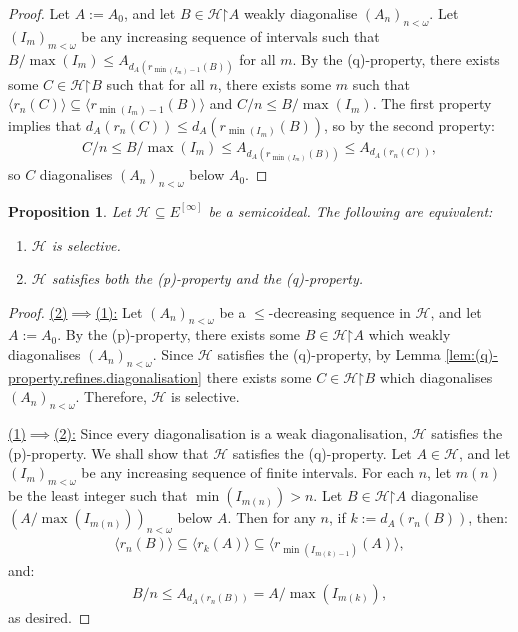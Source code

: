 \documentclass[11pt,reqno]{amsart}
\theoremstyle{plain}
\numberwithin{equation}{section}
\newtheorem{proposition}[theorem]{Proposition}
\theoremstyle{definition}
\renewcommand{\c}[1]{\langle #1 \rangle}
\newcommand{\cal}{\mathcal}
\newcommand{\restrictedto}{\mathord{\upharpoonright}}
\renewcommand{\H}{\cal{H}}
\begin{document}
\begin{proof}
    Let $A := A_0$, and let $B \in \H\restrictedto A$ weakly diagonalise $(A_n)_{n<\omega}$. Let $(I_m)_{m<\omega}$ be any increasing sequence of intervals such that $B/\max(I_m) \leq A_{d_A(r_{\min(I_m)-1}(B))}$ for all $m$. By the (q)-property, there exists some $C \in \H\restrictedto B$ such that for all $n$, there exists some $m$ such that $\c{r_n(C)} \subseteq \c{r_{\min(I_m)-1}(B)}$ and $C/n \leq B/\max(I_m)$. The first property implies that $d_A(r_n(C)) \leq d_A(r_{\min(I_m)}(B))$, so by the second property:
    \begin{align*}
        C/n \leq B/\max(I_m) \leq A_{d_A(r_{\min(I_m)}(B))} \leq A_{d_A(r_n(C))},
    \end{align*}
    so $C$ diagonalises $(A_n)_{n<\omega}$ below $A_0$.
\end{proof}

\begin{proposition}
\label{prop:selective.iff.(p,q)}
    Let $\H \subseteq E^{[\infty]}$ be a semicoideal. The following are equivalent:
    \begin{enumerate}
        \item $\H$ is selective.

        \item $\H$ satisfies both the (p)-property and the (q)-property.
    \end{enumerate}
\end{proposition}

\begin{proof} 
    \underline{(2)$\implies$(1):} Let $(A_n)_{n<\omega}$ be a $\leq$-decreasing sequence in $\H$, and let $A := A_0$. By the (p)-property, there exists some $B \in \H\restrictedto A$ which weakly diagonalises $(A_n)_{n<\omega}$. Since $\H$ satisfies the (q)-property, by Lemma \ref{lem:(q)-property.refines.diagonalisation} there exists some $C \in \H\restrictedto B$ which diagonalises $(A_n)_{n<\omega}$. Therefore, $\H$ is selective.

    \underline{(1)$\implies$(2):} Since every diagonalisation is a weak diagonalisation, $\H$ satisfies the (p)-property. We shall show that $\H$ satisfies the (q)-property. Let $A \in \H$, and let $(I_m)_{m<\omega}$ be any increasing sequence of finite intervals. For each $n$, let $m(n)$ be the least integer such that $\min(I_{m(n)}) > n$. Let $B \in \H\restrictedto A$ diagonalise $(A/\max(I_{m(n)}))_{n<\omega}$ below $A$. Then for any $n$, if $k := d_A(r_n(B))$, then:
    \begin{align*}
        \c{r_n(B)} \subseteq \c{r_k(A)} \subseteq \c{r_{\min(I_{m(k)-1})}(A)},
    \end{align*}
    and:
    \begin{align*}
        B/n \leq A_{d_A(r_n(B))} = A/\max(I_{m(k)}),
    \end{align*}
    as desired.
\end{proof}
\end{document}
